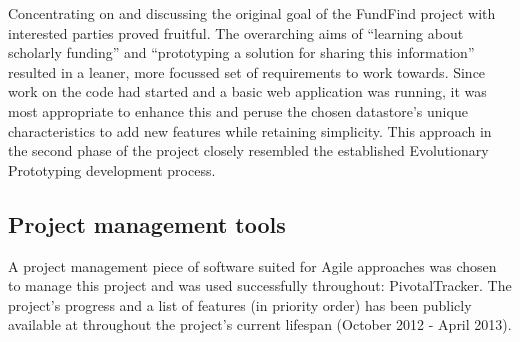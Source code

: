 Concentrating on and discussing the original goal of the FundFind project with interested parties proved fruitful. The overarching aims of ``learning about scholarly funding'' and ``prototyping a solution for sharing this information'' resulted in a leaner, more focussed set of requirements to work towards. Since work on the code had started and a basic web application was running, it was most appropriate to enhance this and peruse the chosen datastore's unique characteristics to add new features while retaining simplicity. This approach in the second phase of the project closely resembled the established Evolutionary Prototyping development process. \cite{evol-proto-def}


\subsection{Project management tools}
\label{pm-tools}
A project management piece of software suited for Agile approaches was chosen to manage this project and was used successfully throughout: PivotalTracker. The project's progress and a list of features (in priority order) has been publicly available at \cite{pm} throughout the project's current lifespan (October 2012 - April 2013).

